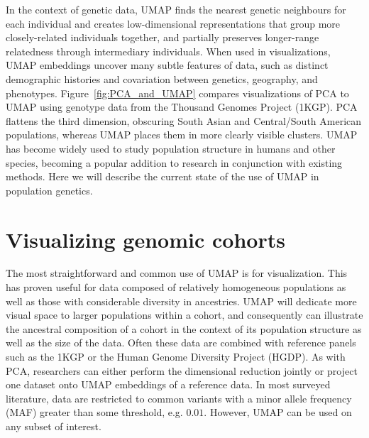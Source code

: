 \documentclass[12pt]{article}
\begin{document}

In the context of genetic data, UMAP finds the nearest genetic neighbours for each individual and creates low-dimensional representations that group more closely-related individuals together, and partially preserves longer-range relatedness through intermediary individuals. When used in visualizations, UMAP embeddings uncover many subtle features of data, such as distinct demographic histories and covariation between genetics, geography, and phenotypes\cite{diaz-papkovich_umap_2019}. Figure~\ref{fig:PCA_and_UMAP} compares visualizations of PCA to UMAP using genotype data from the Thousand Genomes Project (1KGP)\cite{10002015global}. PCA flattens the third dimension, obscuring South Asian and Central/South American populations, whereas UMAP places them in more clearly visible clusters. UMAP has become widely used to study population structure in humans and other species, becoming a popular addition to research in conjunction with existing methods. Here we will describe the current state of the use of UMAP in population genetics.

\section*{Visualizing genomic cohorts}

The most straightforward and common use of UMAP is for visualization. This has proven useful for data composed of relatively homogeneous populations as well as those with considerable diversity in ancestries. UMAP will dedicate more visual space to larger populations within a cohort, and consequently can illustrate the ancestral composition of a cohort in the context of its population structure as well as the size of the data. Often these data are combined with reference panels such as the 1KGP or the Human Genome Diversity Project (HGDP)\cite{cann2002human}.  As with PCA, researchers can either perform the dimensional reduction jointly or project one dataset onto UMAP embeddings of a reference data. In most surveyed literature, data are restricted to common variants with a minor allele frequency (MAF) greater than some threshold, e.g. $0.01$. However, UMAP can be used on any subset of interest.
\end{document}
